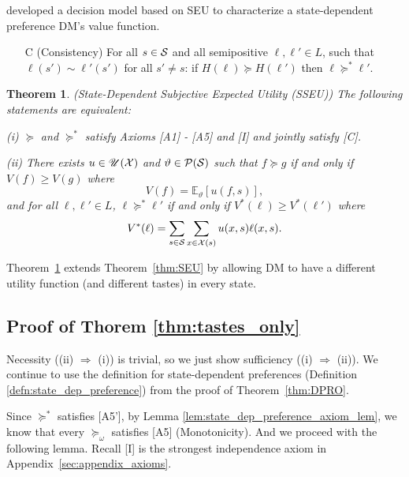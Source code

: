 \documentclass[11pt,oneside]{article}
\theoremstyle{plain}
\theoremstyle{plain}
\theoremstyle{plain}
\newtheorem{thm}{Theorem}[section]
\theoremstyle{plain}
\theoremstyle{plain}
\theoremstyle{definition}
\theoremstyle{definition}
\theoremstyle{remark}
\theoremstyle{plain}
\def\bbe{{\mathbb{E}}}
\newcommand{\pfo}{\pf_\omega}
\newcommand{\calps}{{\cal P}({\cal S})}
\newcommand{\mcs}{{\cal S}}
\newcommand{\pf}{\succeq}
\newcommand{\pfs}{\succeq^*}
\begin{document}
\cite{karni2016expected} developed a decision model based on SEU to characterize a state-dependent preference DM's value function. 
%
\begin{itemize}
\item[C] (Consistency) For all $s\in\mcs$ and all semipositive $\ell,\ell'\in L$, such that $\ell(s') \sim \ell'(s')$ for all $s'\neq s$: if $H(\ell) \succeq H(\ell')$ then $\ell \succeq^* \ell'$.
\end{itemize}
%
%
\begin{thm}
\label{thm:SSEU}
(State-Dependent Subjective Expected Utility (SSEU))
The following statements are equivalent:

(i) $\succeq$ and $\succeq^*$ satisfy Axioms [A1] - [A5] and [I] and jointly satisfy [C].

(ii) There exists $u \in \mathscr{U}({\cal X})$ and $\vartheta \in \calps$ such that $f \succeq g$ if and only if $V(f) \geq V(g)$ where
%
\begin{equation}
\label{eq:SSEU_act}
V(f) = \bbe_{\vartheta}[u(f,s)],
\end{equation}
%
and for all $\ell,\ell' \in L$, $\ell \succeq^* \ell'$ if and only if $V^*(\ell) \geq V^*(\ell')$ where
%
\begin{equation}
\label{eq:SSEU_lottery}
V^*(\ell) = \sum_{s\in \mcs}\sum_{x\in {\cal X}(s)} u(x,s)\ell(x,s).
\end{equation}
%
\end{thm}
\noindent
Theorem~\ref{thm:SSEU} extends Theorem~\ref{thm:SEU} by allowing DM to have a different utility function (and different tastes) in every state.


\subsection{Proof of Thorem \ref{thm:tastes_only}}

Necessity ((ii) $\Rightarrow$ (i)) is trivial, so we just show sufficiency ((i) $\Rightarrow$ (ii)).
We continue to use the definition for state-dependent preferences (Definition \ref{defn:state_dep_preference}) from the proof of Theorem~\ref{thm:DPRO}.

Since $\pfs$ satisfies [A5'], by Lemma \ref{lem:state_dep_preference_axiom_lem}, we know that every $\pfo$ satisfies [A5] (Monotonicity). And we proceed with the following lemma. Recall [I] is the strongest independence axiom in Appendix~\ref{sec:appendix_axioms}.
\end{document}
